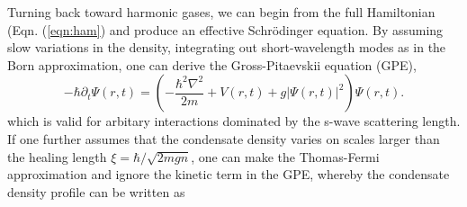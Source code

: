 	Turning back toward harmonic gases, we can begin from the full Hamiltonian (Eqn. (\ref{eqn:ham}) and produce an effective Schr\"{o}dinger equation. By assuming slow variations in the density, integrating out short-wavelength modes as in the Born approximation, one can derive the Gross-Pitaevskii equation (GPE),
	\begin{equation}
		-\hbar\partial_t\Psi(r,t) = \left(-\frac{\hbar^2\nabla^2}{2m} + V(r,t) + g|\Psi(r,t)|^2\right)\Psi(r,t).
		\label{eqn:GPE}
	\end{equation}
	which is valid for arbitary interactions dominated by the s-wave scattering length.  If one further assumes that the condensate density varies on scales larger than the healing length $\xi = \hbar/\sqrt{2mgn}$, one can make the Thomas-Fermi approximation and ignore the kinetic term in the GPE, whereby the condensate density profile can be written as

